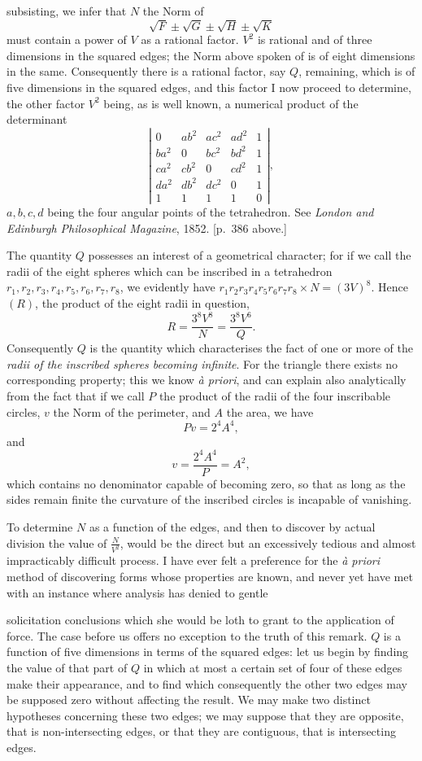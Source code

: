 \documentclass[11pt]{article}
\newcommand{\sourcepage}[1]{\marginpar{\scriptsize p.~#1}}
\begin{document}
{{\sourcepage{405}
subsisting, we infer that $N$ the Norm of
\[
\sqrt F\pm\sqrt G\pm\sqrt H\pm\sqrt K
\]
must contain a power of $V$ as a rational factor. $V^2$ is rational and of three dimensions in the squared edges; the Norm above spoken of is of eight dimensions in the same. Consequently there is a rational factor, say $Q$, remaining, which is of five dimensions in the squared edges, and this factor I now proceed to determine, the other factor $V^2$ being, as is well known, a numerical product of the determinant
\[
\left|\begin{array}{ccccc}
0&ab^2&ac^2&ad^2&1\\
ba^2&0&bc^2&bd^2&1\\
ca^2&cb^2&0&cd^2&1\\
da^2&db^2&dc^2&0&1\\
1&1&1&1&0
\end{array}\right|,
\]
$a,b,c,d$ being the four angular points of the tetrahedron. See \emph{London and Edinburgh Philosophical Magazine}, 1852. [p.~386 above.]

The quantity $Q$ possesses an interest of a geometrical character; for if we call the radii of the eight spheres which can be inscribed in a tetrahedron $r_1,r_2,r_3,r_4,r_5,r_6,r_7,r_8$, we evidently have $r_1r_2r_3r_4r_5r_6r_7r_8\times N=(3V)^8$. Hence $(R)$, the product of the eight radii in question,
\[
R=\frac{3^8V^8}{N}=\frac{3^8V^6}{Q}.
\]
Consequently $Q$ is the quantity which characterises the fact of one or more of the \emph{radii of the inscribed spheres becoming infinite}. For the triangle there exists no corresponding property; this we know \emph{à priori}, and can explain also analytically from the fact that if we call $P$ the product of the radii of the four inscribable circles, $v$ the Norm of the perimeter, and $A$ the area, we have
\[
Pv=2^4A^4,
\]
and
\[
v=\frac{2^4A^4}{P}=A^2,
\]
which contains no denominator capable of becoming zero, so that as long as the sides remain finite the curvature of the inscribed circles is incapable of vanishing.

To determine $N$ as a function of the edges, and then to discover by actual division the value of $\frac{N}{V^2}$, would be the direct but an excessively tedious and almost impracticably difficult process. I have ever felt a preference for the \emph{à priori} method of discovering forms whose properties are known, and never yet have met with an instance where analysis has denied to gentle

\sourcepage{406}
solicitation conclusions which she would be loth to grant to the application of force. The case before us offers no exception to the truth of this remark. $Q$ is a function of five dimensions in terms of the squared edges: let us begin by finding the value of that part of $Q$ in which at most a certain set of four of these edges make their appearance, and to find which consequently the other two edges may be supposed zero without affecting the result. We may make two distinct hypotheses concerning these two edges; we may suppose that they are opposite, that is non-intersecting edges, or that they are contiguous, that is intersecting edges.

}}
\end{document}
